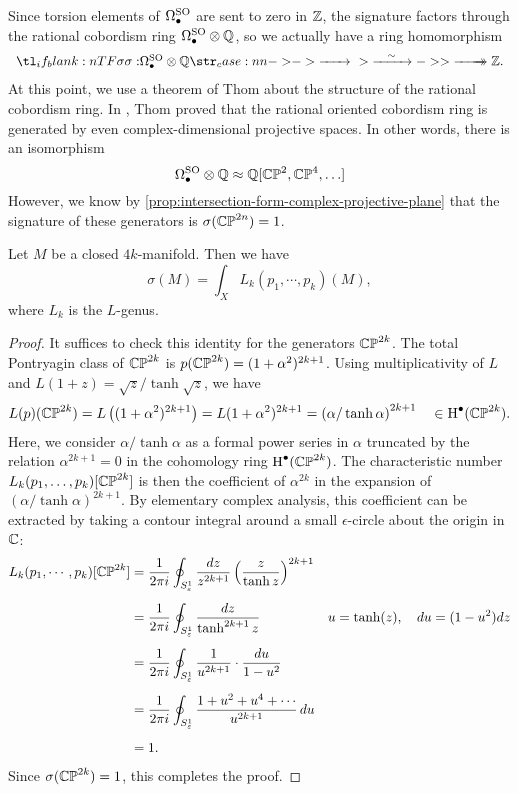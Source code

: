 Since torsion elements of $\Omega^{\mathrm{SO}}_\bullet$ are sent to zero in $\mathbb{Z}$, the signature factors through the rational cobordism ring $\Omega^{\mathrm{SO}}_\bullet\otimes \mathbb{Q}$, so we actually have a ring homomorphism
\[
	\lkxfunc{\sigma}{\Omega^\SO_\bullet\otimes \Q}{\Z.}
\]
At this point, we use a theorem of Thom about the structure of the rational cobordism ring. In \cite{thom1954}, Thom proved that the rational oriented cobordism ring is generated by even complex-dimensional projective spaces. In other words, there is an isomorphism
\[
	\Omega_\bullet^{\mathrm{SO}} \otimes \mathbb{Q} \approx \mathbb{Q}[\mathbb{CP}^2, \mathbb{CP}^4,\ldots ]
\]
However, we know by \cref{prop:intersection-form-complex-projective-plane} that the signature of these generators is $\sigma(\mathbb{CP}^{2n})=1$.

\begin{theorem}[Hirzebruch]\label{thm:hirzebruch-signature-theorem}
	Let $M$ be a closed $4k$-manifold. Then we have
	\[
		\sigma(M) = \int_X L_k(p_1, \cdots, p_k)(M),
	\]
	where $L_k$ is the $L$-genus.
\end{theorem}
\begin{proof}
	It suffices to check this identity for the generators $\mathbb{CP}^{2k}$. The total Pontryagin class of $\mathbb{CP}^{2k}$ is $p(\mathbb{CP}^{2k})=(1+\alpha^2)^{2k+1}$. Using multiplicativity of $L$ and $L(1+z)=\sqrt{z}/\tanh\sqrt{z}$, we have
	\[
		\begin{aligned}
			L(p)(\mathbb{CP}^{2k})
			= L\left((1+\alpha^2)^{2k+1}\right)
			= L(1+\alpha^2)^{2k+1}
			= \left(\alpha/\tanh \alpha\right)^{2k+1}
			\quad\in\operatorname{H}^\bullet(\mathbb{CP}^{2k}).
		\end{aligned}
	\]
	Here, we consider $\alpha/\tanh \alpha$ as a formal power series in $\alpha$ truncated by the relation $\alpha^{2k+1}=0$ in the cohomology ring $\operatorname{H}^\bullet(\mathbb{CP}^{2k})$. The characteristic number $L_k(p_1,\ldots,p_k)[\mathbb{CP}^{2k}]$ is then the coefficient of $\alpha^{2k}$ in the expansion of $(\alpha/\tanh \alpha)^{2k+1}$.
	By elementary complex analysis, this coefficient can be extracted by taking a contour integral around a small $\epsilon$-circle about the origin in $\mathbb{C}$:
	\[
		\begin{aligned}
			L_k(p_1,\cdots, p_k)[\mathbb{CP}^{2k}]
			 & = \frac{1}{2\pi i}\oint_{S^1_\varepsilon} \frac{dz}{z^{2k+1}} \left(\frac{z}{\tanh z}\right)^{2k+1}
			 &                                                                                                       \\[0.5em]
			 & = \frac{1}{2\pi i}\oint_{S^1_\varepsilon} \frac{dz}{\tanh^{2k+1} z}\quad
			 & u  =\tanh(z),\quad
			du =(1-u^2)dz
			\\[0.5em]
			 & = \frac{1}{2\pi i}\oint_{S^1_\varepsilon} \frac{1}{u^{2k+1}}\cdot\frac{du}{1-u^2}
			 &                                                                                                       \\[0.5em]
			 & = \frac{1}{2\pi i}\oint_{S^1_\varepsilon} \frac{1+u^2+u^4+\cdots}{u^{2k+1}}\,du                       \\[0.5em]
			 & =1.                                                                                                 &
		\end{aligned}
	\]
	Since $\sigma(\mathbb{CP}^{2k})=1$, this completes the proof.
\end{proof}

